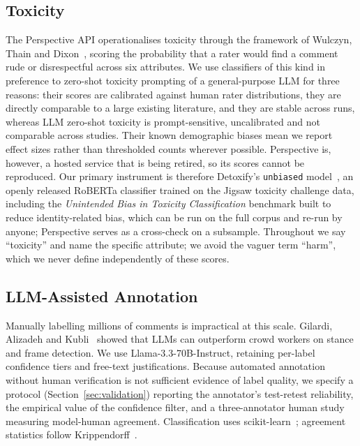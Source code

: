 \subsection{Toxicity}
The Perspective API operationalises toxicity through the framework of Wulczyn,
Thain and Dixon~\cite{wulczyn2017}, scoring the probability that a rater would find a
comment rude or disrespectful across six attributes. We use classifiers of this
kind in preference to zero-shot toxicity prompting of a general-purpose LLM for three
reasons: their scores are calibrated against human rater distributions, they are
directly comparable to a large existing literature, and they are stable across runs,
whereas LLM zero-shot toxicity is prompt-sensitive, uncalibrated and not comparable
across studies. Their known demographic biases mean we report effect sizes rather than
thresholded counts wherever possible. Perspective is, however, a hosted service that
is being retired, so its scores cannot be reproduced. Our primary instrument is
therefore Detoxify's \texttt{unbiased} model~\cite{detoxify2020}, an openly
released RoBERTa classifier trained on the Jigsaw toxicity challenge data,
including the \emph{Unintended Bias in Toxicity Classification} benchmark built to
reduce identity-related bias, which can be run on the full corpus and re-run by
anyone; Perspective serves as a cross-check
on a subsample. Throughout we say ``toxicity'' and name the specific attribute; we
avoid the vaguer term ``harm'', which we never define independently of these
scores.

\subsection{LLM-Assisted Annotation}
Manually labelling millions of comments is impractical at this scale. Gilardi,
Alizadeh and Kubli~\cite{gilardi2023} showed that LLMs can outperform crowd workers
on stance and frame detection. We use Llama-3.3-70B-Instruct, retaining per-label
confidence tiers and free-text justifications. Because automated annotation without
human verification is not sufficient evidence of label quality, we specify a
protocol (Section~\ref{sec:validation}) reporting the annotator's test-retest reliability, the empirical value of the confidence filter, and a three-annotator human study measuring
model-human agreement.
Classification uses scikit-learn~\cite{pedregosa2011}; agreement statistics follow
Krippendorff~\cite{hayes2007}.

